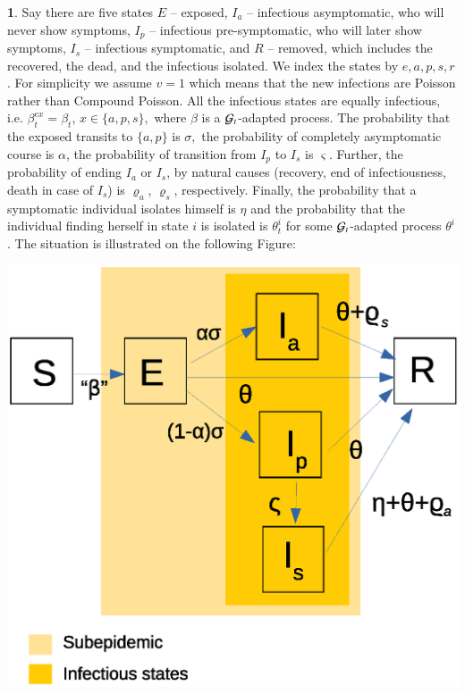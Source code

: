 \documentclass[english]{elsarticle}
\theoremstyle{plain}
\theoremstyle{remark}
\theoremstyle{plain}
\theoremstyle{definition}
\newtheorem{example}[thm]{\protect\examplename}
\providecommand{\examplename}{Example}
\begin{document}
\begin{example}
\label{exa:e1}Say there are five states $E$ -- exposed, $I_{a}$
-- infectious asymptomatic, who will never show symptoms, $I_{p}$
-- infectious pre-symptomatic, who will later show symptoms, $I_{s}$
-- infectious symptomatic, and $R$ -- removed, which includes the
recovered, the dead, and the infectious isolated. We index the states
by $e,a,p,s,r$. For simplicity we assume $v=1$ which means that
the new infections are Poisson rather than Compound Poisson. All the
infectious states are equally infectious, i.e. $\beta_{t}^{ex}=\beta_{t}$,
$x\in\{a,p,s\},$ where $\beta$ is a $\mathcal{G}_{t}$-adapted process. The
probability that the exposed transits to $\{a,p\}$ is $\sigma,$
the probability of completely asymptomatic course is $\alpha$, the
probability of transition from $I_{p}$ to $I_{s}$ is $\varsigma$.
Further, the probability of ending $I_{a}$ or $I_{s}$, by natural
causes (recovery, end of infectiousness, death in case of $I_{s}$)
is $\varrho_{a}$, $\varrho_{s}$, respectively. Finally, the probability
that a symptomatic individual isolates himself is $\eta$ and the
probability that the individual finding herself in state $i$ is isolated
is $\theta_{t}^{i}$ for some $\mathcal{G}_{t}$-adapted process $\theta^{i}$.
The situation is illustrated on the following Figure: 
\begin{center}
\includegraphics[scale=0.3]{simple}
\par\end{center}


\end{example}
\end{document}
